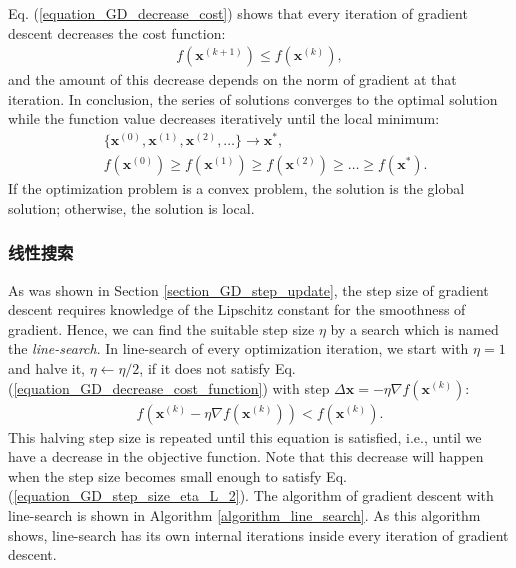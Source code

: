\documentclass[lang=cn,10pt]{gorgeousnbook}
\numberwithin{equation}{section}%
\numberwithin{figure}{section}%
\begin{document}
Eq. (\ref{equation_GD_decrease_cost}) shows that every iteration of gradient descent decreases the cost function:
\begin{align}
f(\boldsymbol{x}^{(k+1)}) \leq f(\boldsymbol{x}^{(k)}),
\end{align}
and the amount of this decrease depends on the norm of gradient at that iteration. 
In conclusion, the series of solutions converges to the optimal solution while the function value decreases iteratively until the local minimum:
\begin{align*}
& \{\boldsymbol{x}^{(0)}, \boldsymbol{x}^{(1)}, \boldsymbol{x}^{(2)}, \dots\} \rightarrow \boldsymbol{x}^*, \\
& f(\boldsymbol{x}^{(0)}) \geq f(\boldsymbol{x}^{(1)}) \geq f(\boldsymbol{x}^{(2)}) \geq \dots \geq f(\boldsymbol{x}^*).
\end{align*}
If the optimization problem is a convex problem, the solution is the global solution; otherwise, the solution is local. 
\subsubsection{线性搜索}\label{section_GD_line_search}

As was shown in Section \ref{section_GD_step_update}, the step size of gradient descent requires knowledge of the Lipschitz constant for the smoothness of gradient. Hence, we can find the suitable step size $\eta$ by a search which is named the \textit{line-search}. In line-search of every optimization iteration, we start with $\eta=1$ and halve it, $\eta \gets \eta/2$, if it does not satisfy Eq. (\ref{equation_GD_decrease_cost_function}) with step $\Delta \boldsymbol{x} = -\eta \nabla f(\boldsymbol{x}^{(k)})$:
\begin{align}\label{equation_GD_line_search_condition}
f(\boldsymbol{x}^{(k)} -\eta \nabla f(\boldsymbol{x}^{(k)})) < f(\boldsymbol{x}^{(k)}).
\end{align}
This halving step size is repeated until this equation is satisfied, i.e., until we have a decrease in the objective function. Note that this decrease will happen when the step size becomes small enough to satisfy Eq. (\ref{equation_GD_step_size_eta_L_2}). 
The algorithm of gradient descent with line-search is shown in Algorithm \ref{algorithm_line_search}.
As this algorithm shows, line-search has its own internal iterations inside every iteration of gradient descent. 
\end{document}
